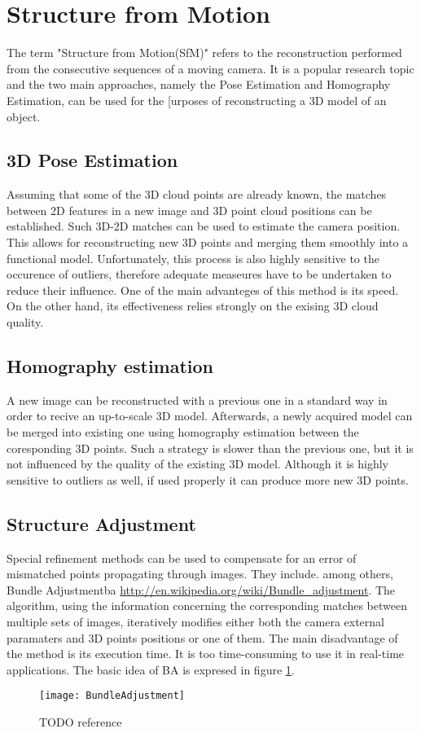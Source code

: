 \section{Structure from Motion}
The term "Structure from Motion(SfM)" refers to the reconstruction performed from the consecutive sequences of a moving camera. It is a popular research topic and the two main approaches, namely the Pose Estimation and Homography Estimation, can be used for the [urposes of reconstructing a 3D model of an object.
\subsection{3D Pose Estimation}
Assuming that some of the 3D cloud points are already known, the matches between 2D features in a new image and 3D point cloud positions can be established. Such 3D-2D matches can be used to estimate the camera position. This allows for reconstructing new 3D points and merging them smoothly into a functional model. Unfortunately,  this process is also highly sensitive to the occurence of outliers, therefore adequate measeures have to be undertaken to reduce their influence. One of the main advanteges of this method is its speed. On the other hand, its effectiveness relies strongly on the exising 3D cloud quality. 
\subsection{Homography estimation}
A new image can be reconstructed with a previous one in a standard way in order to recive an up-to-scale 3D model. Afterwards, a newly acquired model can be merged into existing one using homography estimation between the coresponding 3D points. Such a strategy is slower than the previous one, but it is not influenced by the quality of the existing 3D model. Although it is highly sensitive to outliers as well, if used properly it can produce more new 3D points.
\subsection{Structure Adjustment}
Special refinement methods can be used to compensate for an error of mismatched points propagating through images. They include. among others, Bundle Adjustment\gls{ba} \url{http://en.wikipedia.org/wiki/Bundle_adjustment}. The algorithm, using the information concerning the corresponding matches between multiple sets of images, iteratively modifies either both the camera external paramaters and 3D points positions or one of them. The main disadvantage of the method is its execution time. It is too time-consuming to use it in real-time applications. The basic idea of BA is expresed in figure \ref{fig:BundleAdjustment}.
\begin{figure}[p]
    \centering
    \texttt{[image: BundleAdjustment]}
    \caption{TODO reference}
    \label{fig:BundleAdjustment}
\end{figure}
